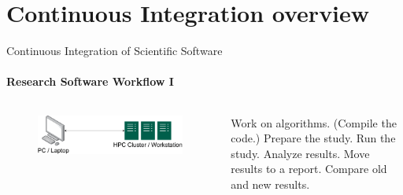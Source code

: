 \section{Continuous Integration overview}

\begin{frame}{Continuous Integration of Scientific Software}
    \framesubtitle{Research Software Workflow I} 
    \vfill

    \begin{columns}
        \begin{column}[c]{0.5\textwidth}
            \begin{figure}
                \centering
                \includegraphics[width=\columnwidth]{figures/workflow-overview.png}
            \end{figure}
        \end{column}
        \begin{column}[c]{0.5\textwidth}
        \begin{algorithmic}
                \State Work on algorithms.
                \State (Compile the code.) 
                    \State Prepare the study. 
                    \State Run the study. 
                    \State Analyze results. 
                    \State Move results to a report. 
                \EndFor
                \State Compare old and new results. 
            \EndWhile
        \end{algorithmic}
        \end{column}
    \end{columns}

\end{frame}

